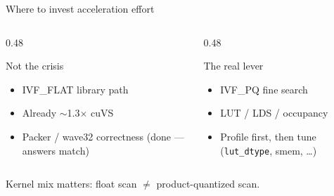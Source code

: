 \documentclass[aspectratio=169,11pt]{beamer}
\begin{document}
\begin{frame}{Where to invest acceleration effort}
  \begin{columns}[T]
    \begin{column}{0.48\textwidth}
      \begin{block}{Not the crisis}
        \footnotesize
        \begin{itemize}
          \item IVF\_FLAT library path
          \item Already $\sim$1.3$\times$ cuVS
          \item Packer / wave32 correctness
                (done --- answers match)
        \end{itemize}
      \end{block}
    \end{column}
    \begin{column}{0.48\textwidth}
      \begin{block}{The real lever}
        \footnotesize
        \begin{itemize}
          \item IVF\_PQ fine search
          \item LUT / LDS / occupancy
          \item Profile first, then tune
                (\texttt{lut\_dtype}, smem, \ldots)
        \end{itemize}
      \end{block}
    \end{column}
  \end{columns}

  \vspace{0.7em}
  \begin{center}
    {\large Kernel mix matters: float scan $\neq$ product-quantized scan.}
  \end{center}
\end{frame}
\end{document}

